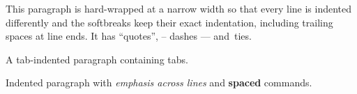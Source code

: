 \documentclass{article}
\begin{document}
This paragraph is hard-wrapped at a narrow width so that every line
    is indented differently and the softbreaks keep
  their exact indentation, including trailing spaces
at line ends. It has ``quotes'', -- dashes --- and~ties.

	A tab-indented paragraph	containing tabs.

    Indented paragraph with \emph{emphasis
    across lines} and \textbf {spaced} commands.
\end{document}
